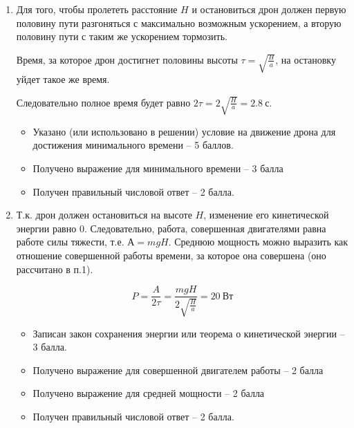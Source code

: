 \solutionSection

\begin{enumerate}
    \item Для того, чтобы пролететь расстояние $H$ и остановиться дрон должен первую половину пути разгоняться с максимально возможным ускорением, а вторую половину пути с таким же ускорением тормозить.
    
    Время, за которое дрон достигнет половины высоты $\tau =\sqrt{\frac{H}{a}}$, на остановку уйдет такое же время.
    
    Следовательно полное время будет равно $2\tau =2 \sqrt{\frac{H}{a}} = 2.8 \: \text{с}$.


    \markSection
    
    \begin{itemize}
        \item Указано (или использовано в решении) условие на движение дрона для достижения минимального времени – 5 баллов.
        \item Получено выражение для минимального времени – 3 балла
        \item Получен правильный числовой ответ – 2 балла.
    \end{itemize}

    \item Т.к. дрон должен остановиться на высоте $H$, изменение его кинетической энергии равно 0. Следовательно, работа, совершенная двигателями равна работе силы тяжести, т.е. $А = mgH$. Среднюю мощность можно выразить как отношение совершенной работы времени, за которое она совершена (оно рассчитано в п.1).

    $$P=\frac{A}{2\tau} =\frac{mgH}{2\sqrt{\frac{H}{a}}}=20 \: \text{Вт}$$


    \markSection
    
    \begin{itemize}
        \item Записан закон сохранения энергии или теорема о кинетической энергии – 3 балла.
        \item Получено выражение для совершенной двигателем работы – 2 балла
        \item Получено выражение для средней мощности – 2 балла
        \item Получен правильный числовой ответ – 2 балла.
    \end{itemize}


\end{enumerate}
